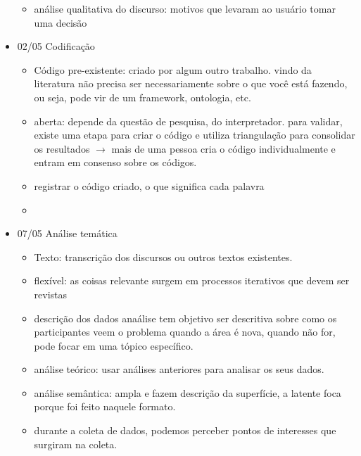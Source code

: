 \documentclass[11pt,a4paper]{book}
\begin{document}
\begin{itemize}
\begin{itemize}
			\item análise qualitativa do discurso: motivos que levaram ao usuário tomar uma decisão
			
		\end{itemize}
		
	\item 02/05
	Codificação
	
	
	\begin{itemize}
		\item Código pre-existente: criado por algum outro trabalho. vindo da literatura não precisa ser necessariamente sobre o que você está fazendo, ou seja, pode vir de um framework, ontologia, etc.
		\item aberta: depende da questão de pesquisa, do interpretador. para validar, existe uma etapa para criar o código e utiliza triangulação para consolidar os resultados $\rightarrow$ mais de uma pessoa cria o código individualmente e entram em consenso sobre os códigos.
		\item registrar o código criado, o que significa cada palavra
		\item 
	\end{itemize}
		
		\item 07/05
		Análise temática
		
		\begin{itemize}
			\item Texto: transcrição dos discursos ou outros textos existentes.
			\item flexível: as coisas relevante surgem em processos iterativos que devem ser revistas
			\item descrição dos dados anaálise tem objetivo ser descritiva sobre como os participantes veem o problema quando a área é nova, quando não for, pode focar em uma tópico específico.
			\item análise teórico: usar análises anteriores para analisar os seus dados.
			\item análise semântica: ampla e fazem descrição da superfície, a latente foca porque foi feito naquele formato.
			\item durante a coleta de dados, podemos perceber pontos de interesses que surgiram na coleta.
		\end{itemize}
	\end{itemize}
\end{document}
